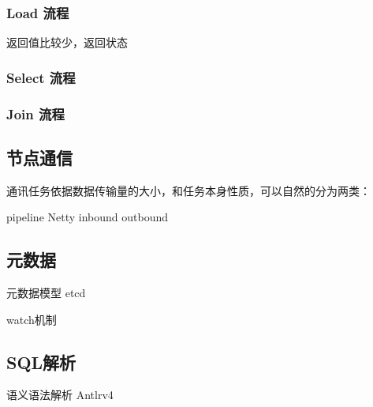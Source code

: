 \documentclass[a4paper, 12pt]{ctexart}
\begin{document}
\subsubsection{Load 流程}
返回值比较少，返回状态

\subsubsection{Select 流程}


\subsubsection{Join 流程}



\subsection{节点通信}
通讯任务依据数据传输量的大小，和任务本身性质，可以自然的分为两类：


pipeline  Netty inbound outbound



\subsection{元数据}
元数据模型  etcd   


watch机制



\subsection{SQL解析}
语义语法解析
Antlrv4
\end{document}
